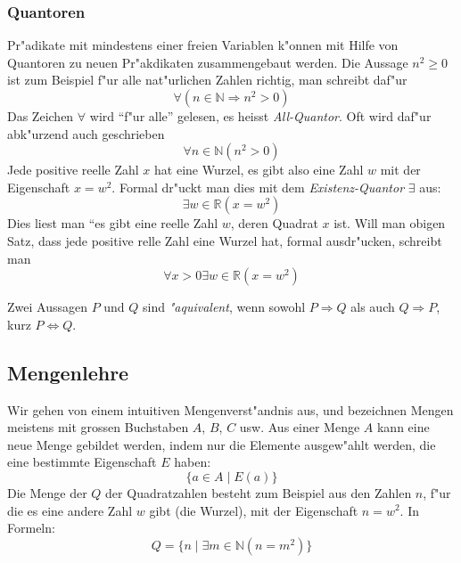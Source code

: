 \subsubsection{Quantoren}
Pr"adikate mit mindestens einer freien Variablen k"onnen mit Hilfe
von Quantoren zu neuen Pr"akdikaten zusammengebaut werden. 
Die Aussage $n^2\ge 0$ ist zum Beispiel f"ur alle nat"urlichen
Zahlen richtig, man schreibt daf"ur
\[
\forall (n\in\mathbb N\Rightarrow n^2>0)
\]
Das Zeichen $\forall$ wird ``f"ur alle'' gelesen, es heisst
{\em All-Quantor}.
Oft wird daf"ur abk"urzend auch geschrieben
\[
\forall n\in\mathbb N(n^2>0)
\]
Jede positive reelle Zahl $x$ hat eine Wurzel, es gibt also eine
Zahl $w$ mit der Eigenschaft $x=w^2$. Formal dr"uckt man dies mit
dem {\em Existenz-Quantor} $\exists$ aus:
\[
\exists w\in\mathbb R(x =w^2)
\]
Dies liest man ``es gibt eine reelle Zahl $w$, deren Quadrat $x$ ist.
Will man obigen Satz, dass jede positive relle Zahl eine Wurzel hat,
formal ausdr"ucken, schreibt man
\[
\forall x>0\exists w\in\mathbb R(x=w^2)
\]

Zwei Aussagen $P$ und $Q$ sind {\em "aquivalent}, wenn sowohl
$P\Rightarrow Q$ als auch $Q\Rightarrow P$, kurz $P\Leftrightarrow Q$.

\subsection{Mengenlehre}
Wir gehen von einem intuitiven Mengenverst"andnis aus, und bezeichnen
Mengen meistens mit grossen Buchstaben $A$, $B$, $C$ usw.
Aus einer Menge $A$ kann eine neue Menge gebildet werden, indem
nur die Elemente ausgew"ahlt werden, die eine bestimmte Eigenschaft
$E$ haben:
\[
\{a\in A\;|\;E(a)\}
\]
Die Menge der $Q$ der Quadratzahlen besteht zum Beispiel aus den
Zahlen $n$, f"ur
die es eine andere Zahl $w$ gibt (die Wurzel), mit der Eigenschaft
$n=w^2$.  In Formeln:
\[
Q=\{n\; |\; \exists m\in\mathbb N(n=m^2)\}
\]

